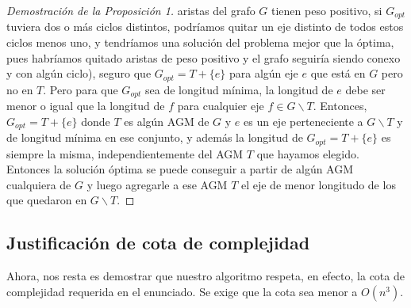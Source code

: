 \documentclass[11pt, a4paper, twoside]{article}
\begin{document}
\begin{proof}[Demostración de la Proposición 1]
aristas del grafo $G$ tienen peso positivo, si $G_{opt}$ tuviera dos o más ciclos distintos,
podríamos quitar un eje distinto de todos estos ciclos menos uno, y tendríamos una solución del problema 
mejor que la óptima, pues habríamos quitado aristas de peso positivo y el grafo seguiría siendo conexo
y con algún ciclo), seguro que
$G_{opt} = T + \{e\}$ para algún eje $e$ que está en $G$ pero no en $T$. Pero para que 
$G_{opt}$ sea de longitud mínima, la longitud de $e$ debe ser menor o igual que la 
longitud de $f$ para cualquier eje $f \in G \backslash T$. Entonces, 
$G_{opt} = T + \{e\}$ donde $T$ es algún AGM de $G$ y $e$ es un eje perteneciente a
$G \backslash T$ y de longitud mínima en ese conjunto, y además la longitud de
$G_{opt} = T + \{e\}$ es siempre la misma, independientemente del AGM $T$ que hayamos
elegido. Entonces la solución óptima se puede conseguir a partir de algún AGM cualquiera de $G$
y luego agregarle a ese AGM $T$ el eje de menor longitudo de los que quedaron en $G \backslash T$.
\end{proof}

\newpage
\subsection{Justificación de cota de complejidad}
Ahora, nos resta es demostrar que nuestro algoritmo respeta, en efecto, la cota
de complejidad requerida en el enunciado. Se exige que la cota sea menor a $O(n^3)$.
\end{document}
